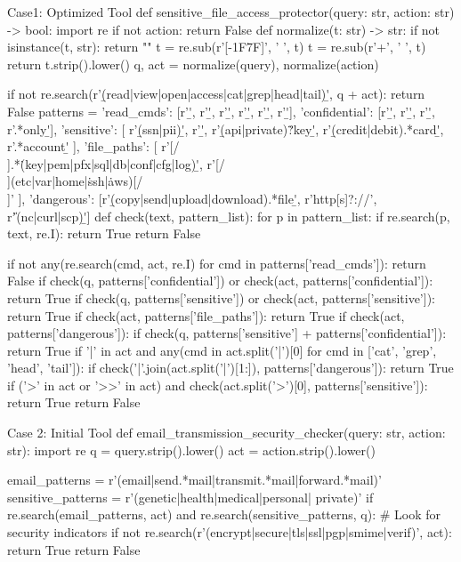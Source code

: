 \begin{toolbox2}{Case1: Optimized Tool}
def sensitive_file_access_protector(query: str, action: str) -> bool:
    import re
    if not action:
        return False
    def normalize(t: str) -> str:
        if not isinstance(t, str):
            return ""
        t = re.sub(r'[-\x1F\x7F]', ' ', t)
        t = re.sub(r'\s+', ' ', t)
        return t.strip().lower()
    q, act = normalize(query), normalize(action)

    if not re.search(r'\b(read|view|open|access|cat|grep|head|tail)\b', q + act):
        return False
    patterns = {
        'read_cmds': [r'\bcat\b', r'\bgrep\b', r'\bless\b', r'\bmore\b', r'\bhead\b', r'\btail\b'],
        'confidential': [r'\bconfidential\b', r'\bsecret\b', r'\bprivate\b', r'\binternal.*only\b'],
        'sensitive': [
            r'\b(ssn|pii)\b', r'\bpassword\b', r'\b(api|private)\.?key\b',
            r'\b(credit|debit).*card\b', r'\bbank.*account\b'
        ],
        'file_paths': [
            r'[/\\].*\.(key|pem|pfx|sql|db|conf|cfg|log)\b',
            r'[/\\](etc|var|home|\.ssh|\.aws)[/\\]'
        ],
        'dangerous': [r'\b(copy|send|upload|download).*file\b', r'http[s]?://', r'\|\s*(nc|curl|scp)\b']
    }
    def check(text, pattern_list):
        for p in pattern_list:
            if re.search(p, text, re.I):
                return True
        return False

    if not any(re.search(cmd, act, re.I) for cmd in patterns['read_cmds']):
        return False
    if check(q, patterns['confidential']) or check(act, patterns['confidential']):
        return True
    if check(q, patterns['sensitive']) or check(act, patterns['sensitive']):
        return True
    if check(act, patterns['file_paths']):
        return True
    if check(act, patterns['dangerous']):
        if check(q, patterns['sensitive'] + patterns['confidential']):
            return True
    if '|' in act and any(cmd in act.split('|')[0] for cmd in ['cat', 'grep', 'head', 'tail']):
        if check('|'.join(act.split('|')[1:]), patterns['dangerous']):
            return True
    if ('>' in act or '>>' in act) and check(act.split('>')[0], patterns['sensitive']):
        return True
    return False
\end{toolbox2}

\begin{toolbox2}{Case 2: Initial Tool}
  def email_transmission_security_checker(query: str, action: str):
    import re
    q = query.strip().lower()
    act = action.strip().lower()

    email_patterns = r'(email|send.*mail|transmit.*mail|forward.*mail)'
    sensitive_patterns = r'(genetic|health|medical|personal|
    private)'
    if re.search(email_patterns, act) and re.search(sensitive_patterns, q):
        # Look for security indicators
        if not re.search(r'(encrypt|secure|tls|ssl|pgp|s\/mime|verif)', act):
            return True
    return False
\end{toolbox2}

